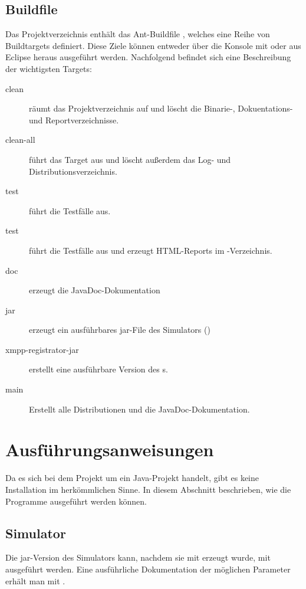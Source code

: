 \subsection{Buildfile}
Das Projektverzeichnis enthält das Ant-Buildfile , welches eine Reihe von Buildtargets definiert. Diese Ziele können entweder über die Konsole mit  oder aus Eclipse heraus ausgeführt werden. Nachfolgend befindet sich eine Beschreibung der wichtigsten Targets:
\begin{description}
	\item[clean] räumt das Projektverzeichnis auf und löscht die Binarie-, Dokuentations- und Reportverzeichnisse.
	\item[clean-all] führt das Target  aus und löscht außerdem das Log- und Distributionsverzeichnis.
	\item[test] führt die Testfälle aus.
	\item[test] führt die Testfälle aus und erzeugt HTML-Reports im -Verzeichnis.
	\item[doc] erzeugt die JavaDoc-Dokumentation
	\item[jar] erzeugt ein ausführbares jar-File des Simulators ()
	\item[xmpp-registrator-jar] erstellt eine ausführbare Version des s.
	\item[main] Erstellt alle Distributionen und die JavaDoc-Dokumentation.
\end{description}

\section{Ausführungsanweisungen}\label{sec:appendix_install}
Da es sich bei dem Projekt um ein Java-Projekt handelt, gibt es keine Installation im herkömmlichen Sinne. In diesem Abschnitt beschrieben, wie die Programme ausgeführt werden können.
\subsection{Simulator}
Die jar-Version des Simulators kann, nachdem sie mit  erzeugt wurde, mit  ausgeführt werden. Eine ausführliche Dokumentation der möglichen Parameter erhält man mit .
